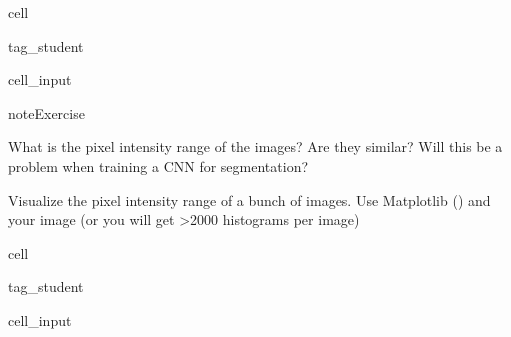 \documentclass[letterpaper,10pt,english]{jupyterBook}
\begin{document}
\begin{sphinxuseclass}{cell}
\begin{sphinxuseclass}{tag_student}\begin{sphinxVerbatimInput}

\begin{sphinxuseclass}{cell_input}
\begin{sphinxVerbatim}[commandchars=\\\{\}]
\end{sphinxVerbatim}

\end{sphinxuseclass}\end{sphinxVerbatimInput}

\end{sphinxuseclass}
\end{sphinxuseclass}
\begin{sphinxadmonition}{note}{Exercise}

\sphinxAtStartPar
What is the pixel intensity range of the images? Are they similar? Will this be a problem when training a CNN for segmentation?

\sphinxAtStartPar
Visualize the pixel intensity range of a bunch of images.  Use Matplotlib  () and  your image (or you will get >2000 histograms per image)
\end{sphinxadmonition}

\begin{sphinxuseclass}{cell}
\begin{sphinxuseclass}{tag_student}\begin{sphinxVerbatimInput}

\begin{sphinxuseclass}{cell_input}
\begin{sphinxVerbatim}[commandchars=\\\{\}]
\end{sphinxVerbatim}

\end{sphinxuseclass}\end{sphinxVerbatimInput}

\end{sphinxuseclass}
\end{sphinxuseclass}
\end{document}
